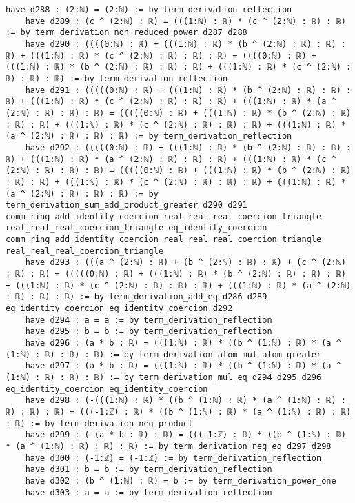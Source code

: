 \documentclass{article}
\begin{document}
\begin{tcolorbox}[colback=white!10, width=\linewidth]
\begin{lstlisting}[language=Lean4]
    have d288 : (2:ℕ) = (2:ℕ) := by term_derivation_reflection
    have d289 : (c ^ (2:ℕ) : ℝ) = (((1:ℕ) : ℝ) * (c ^ (2:ℕ) : ℝ) : ℝ) := by term_derivation_non_reduced_power d287 d288
    have d290 : ((((0:ℕ) : ℝ) + (((1:ℕ) : ℝ) * (b ^ (2:ℕ) : ℝ) : ℝ) : ℝ) + (((1:ℕ) : ℝ) * (c ^ (2:ℕ) : ℝ) : ℝ) : ℝ) = ((((0:ℕ) : ℝ) + (((1:ℕ) : ℝ) * (b ^ (2:ℕ) : ℝ) : ℝ) : ℝ) + (((1:ℕ) : ℝ) * (c ^ (2:ℕ) : ℝ) : ℝ) : ℝ) := by term_derivation_reflection
    have d291 : (((((0:ℕ) : ℝ) + (((1:ℕ) : ℝ) * (b ^ (2:ℕ) : ℝ) : ℝ) : ℝ) + (((1:ℕ) : ℝ) * (c ^ (2:ℕ) : ℝ) : ℝ) : ℝ) + (((1:ℕ) : ℝ) * (a ^ (2:ℕ) : ℝ) : ℝ) : ℝ) = (((((0:ℕ) : ℝ) + (((1:ℕ) : ℝ) * (b ^ (2:ℕ) : ℝ) : ℝ) : ℝ) + (((1:ℕ) : ℝ) * (c ^ (2:ℕ) : ℝ) : ℝ) : ℝ) + (((1:ℕ) : ℝ) * (a ^ (2:ℕ) : ℝ) : ℝ) : ℝ) := by term_derivation_reflection
    have d292 : (((((0:ℕ) : ℝ) + (((1:ℕ) : ℝ) * (b ^ (2:ℕ) : ℝ) : ℝ) : ℝ) + (((1:ℕ) : ℝ) * (a ^ (2:ℕ) : ℝ) : ℝ) : ℝ) + (((1:ℕ) : ℝ) * (c ^ (2:ℕ) : ℝ) : ℝ) : ℝ) = (((((0:ℕ) : ℝ) + (((1:ℕ) : ℝ) * (b ^ (2:ℕ) : ℝ) : ℝ) : ℝ) + (((1:ℕ) : ℝ) * (c ^ (2:ℕ) : ℝ) : ℝ) : ℝ) + (((1:ℕ) : ℝ) * (a ^ (2:ℕ) : ℝ) : ℝ) : ℝ) := by term_derivation_sum_add_product_greater d290 d291 comm_ring_add_identity_coercion real_real_real_coercion_triangle real_real_real_coercion_triangle eq_identity_coercion comm_ring_add_identity_coercion real_real_real_coercion_triangle real_real_real_coercion_triangle
    have d293 : (((a ^ (2:ℕ) : ℝ) + (b ^ (2:ℕ) : ℝ) : ℝ) + (c ^ (2:ℕ) : ℝ) : ℝ) = (((((0:ℕ) : ℝ) + (((1:ℕ) : ℝ) * (b ^ (2:ℕ) : ℝ) : ℝ) : ℝ) + (((1:ℕ) : ℝ) * (c ^ (2:ℕ) : ℝ) : ℝ) : ℝ) + (((1:ℕ) : ℝ) * (a ^ (2:ℕ) : ℝ) : ℝ) : ℝ) := by term_derivation_add_eq d286 d289 eq_identity_coercion eq_identity_coercion d292
    have d294 : a = a := by term_derivation_reflection
    have d295 : b = b := by term_derivation_reflection
    have d296 : (a * b : ℝ) = (((1:ℕ) : ℝ) * ((b ^ (1:ℕ) : ℝ) * (a ^ (1:ℕ) : ℝ) : ℝ) : ℝ) := by term_derivation_atom_mul_atom_greater
    have d297 : (a * b : ℝ) = (((1:ℕ) : ℝ) * ((b ^ (1:ℕ) : ℝ) * (a ^ (1:ℕ) : ℝ) : ℝ) : ℝ) := by term_derivation_mul_eq d294 d295 d296 eq_identity_coercion eq_identity_coercion
    have d298 : (-(((1:ℕ) : ℝ) * ((b ^ (1:ℕ) : ℝ) * (a ^ (1:ℕ) : ℝ) : ℝ) : ℝ) : ℝ) = (((-1:ℤ) : ℝ) * ((b ^ (1:ℕ) : ℝ) * (a ^ (1:ℕ) : ℝ) : ℝ) : ℝ) := by term_derivation_neg_product
    have d299 : (-(a * b : ℝ) : ℝ) = (((-1:ℤ) : ℝ) * ((b ^ (1:ℕ) : ℝ) * (a ^ (1:ℕ) : ℝ) : ℝ) : ℝ) := by term_derivation_neg_eq d297 d298
    have d300 : (-1:ℤ) = (-1:ℤ) := by term_derivation_reflection
    have d301 : b = b := by term_derivation_reflection
    have d302 : (b ^ (1:ℕ) : ℝ) = b := by term_derivation_power_one
    have d303 : a = a := by term_derivation_reflection

\end{lstlisting}
\end{tcolorbox}
\end{document}
